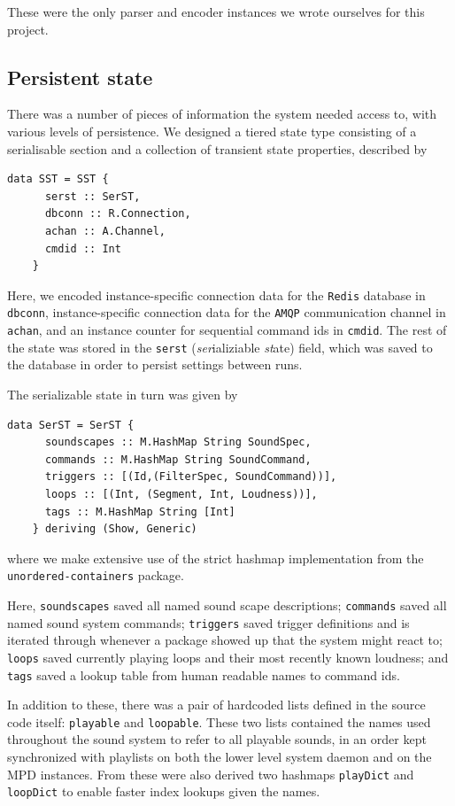 These were the only parser and encoder instances we wrote ourselves for
this project.


\subsection{Persistent state}
\label{sec:persistent-state}

There was a number of pieces of information the system needed access
to, with various levels of persistence. We designed a tiered state
type consisting of a serialisable section and a collection of
transient state properties, described by
\begin{verbatim}
data SST = SST {
      serst :: SerST,
      dbconn :: R.Connection,
      achan :: A.Channel,
      cmdid :: Int
    } 
\end{verbatim}
Here, we encoded instance-specific connection data for the \texttt{Redis} database in
\texttt{dbconn}, instance-specific connection data for the \texttt{AMQP}
communication channel in \texttt{achan}, and an instance counter for
sequential command ids in \texttt{cmdid}. The rest of the state was
stored in the \texttt{serst} (\emph{ser}ializiable \emph{st}ate) field,
which was saved
to the database in order to persist settings between runs.

The serializable state in turn was given by
\begin{verbatim}
data SerST = SerST {
      soundscapes :: M.HashMap String SoundSpec,
      commands :: M.HashMap String SoundCommand,
      triggers :: [(Id,(FilterSpec, SoundCommand))],
      loops :: [(Int, (Segment, Int, Loudness))],
      tags :: M.HashMap String [Int]
    } deriving (Show, Generic)
\end{verbatim}
where we make extensive use of the strict hashmap implementation from
the \texttt{unordered-containers} package.

Here, \texttt{soundscapes} saved all named sound scape descriptions;
\texttt{commands} saved all named sound system commands;
\texttt{triggers} saved trigger definitions and is iterated through
whenever a package showed up that the system might react to;
\texttt{loops} saved currently playing loops and their most recently
known loudness; and \texttt{tags} saved a lookup table from human
readable names to command ids.

In addition to these, there was a pair of hardcoded lists defined in
the source code itself: \texttt{playable} and \texttt{loopable}.
These two lists contained the names used throughout the sound system to
refer to all playable sounds, in an order kept synchronized with
playlists on both the lower level system daemon and on the MPD
instances. From these were also derived two hashmaps \texttt{playDict} and \texttt{loopDict} to enable faster index lookups given the names.


